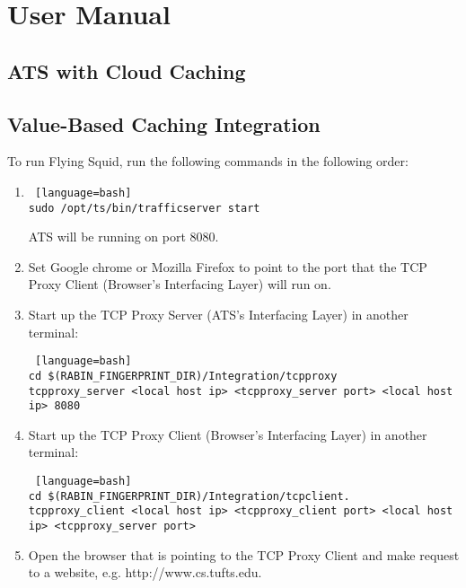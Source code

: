 \section{User Manual}

\subsection{ATS with Cloud Caching}



\subsection{Value-Based Caching Integration}

To run Flying Squid, run the following commands in the following order:

\begin{enumerate}

\item 

\begin{lstlisting} [language=bash] 
sudo /opt/ts/bin/trafficserver start
\end{lstlisting}

ATS will be running on port 8080.

\item 

Set Google chrome or Mozilla Firefox to point to the port that the TCP Proxy Client (Browser's Interfacing Layer) will run on. 

\item 

Start up the TCP Proxy Server (ATS's Interfacing Layer) in another terminal:

\begin{lstlisting} [language=bash] 
cd $(RABIN_FINGERPRINT_DIR)/Integration/tcpproxy
tcpproxy_server <local host ip> <tcpproxy_server port> <local host ip> 8080
\end{lstlisting}

\item

Start up the TCP Proxy Client (Browser's Interfacing Layer) in another terminal:

\begin{lstlisting} [language=bash] 
cd $(RABIN_FINGERPRINT_DIR)/Integration/tcpclient.
tcpproxy_client <local host ip> <tcpproxy_client port> <local host ip> <tcpproxy_server port>
\end{lstlisting}

\item

Open the browser that is pointing to the TCP Proxy Client and make request to a website, e.g. http://www.cs.tufts.edu.

\end{enumerate}

